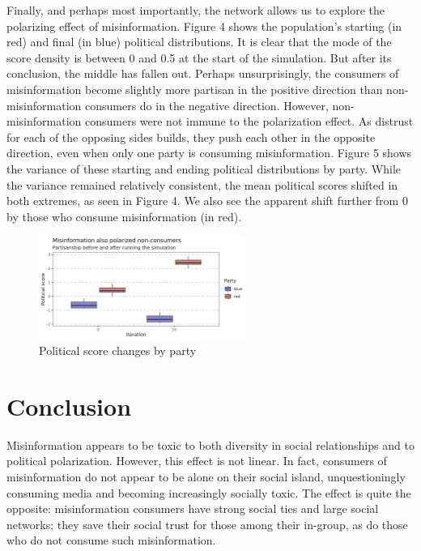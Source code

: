 \documentclass[titlepage, 12pt, leqno]{article}
\begin{document}
Finally, and perhaps most importantly, the network allows us to explore the polarizing effect of misinformation. Figure 4 shows the population's starting (in red) and final (in blue) political distributions. It is clear that the mode of the score density is between 0 and 0.5 at the start of the simulation. But after its conclusion, the middle has fallen out. Perhaps unsurprisingly, the consumers of misinformation become slightly more partisan in the positive direction than non-misinformation consumers do in the negative direction. However, non-misinformation consumers were not immune to the polarization effect. As distrust for each of the opposing sides builds, they push each other in the opposite direction, even when only one party is consuming misinformation. Figure 5 shows the variance of these starting and ending political distributions by party. While the variance remained relatively consistent, the mean political scores shifted in both extremes, as seen in Figure 4. We also see the apparent shift further from 0 by those who consume misinformation (in red).

\begin{figure}[ht]
    \centering
    \includegraphics[width=0.6\textwidth]{../plots/polscore_change_box.png}
    \caption{Political score changes by party}
\end{figure}

\FloatBarrier
\pagebreak
\section{Conclusion}
Misinformation appears to be toxic to both diversity in social relationships and to political polarization. However, this effect is not linear. In fact, consumers of misinformation do not appear to be alone on their social island, unquestioningly consuming media and becoming increasingly socially toxic. The effect is quite the opposite: misinformation consumers have strong social ties and large social networks; they save their social trust for those among their in-group, as do those who do not consume such misinformation.
\end{document}
